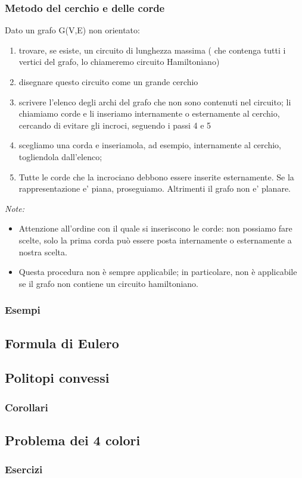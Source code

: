 \subsubsection{Metodo del cerchio e delle corde}
Dato un grafo G(V,E) non orientato:
\begin{enumerate}
\item trovare, se esiste, un circuito di lunghezza massima ( che
contenga tutti i vertici del grafo, lo chiameremo circuito
Hamiltoniano)
\item disegnare questo circuito come un grande cerchio
\item scrivere l'elenco degli archi del grafo che non sono
contenuti nel circuito; li chiamiamo corde e li inseriamo
internamente o esternamente al cerchio, cercando di
evitare gli incroci, seguendo i passi 4 e 5
\item scegliamo una corda e inseriamola, ad esempio,
internamente al cerchio, togliendola dall'elenco;
\item Tutte le corde che la incrociano debbono essere inserite
esternamente. Se la rappresentazione e' piana,
proseguiamo. Altrimenti il grafo non e' planare.
\end{enumerate}
\emph{Note:}
\begin{itemize}
\item Attenzione all'ordine con il quale si inseriscono le corde:
non possiamo fare scelte, solo la prima corda può essere
posta internamente o esternamente a nostra scelta.
\item Questa procedura non è sempre applicabile; in
particolare, non è applicabile se il grafo non contiene un
circuito hamiltoniano.
\end{itemize}

\subsubsection{Esempi}

\subsection{Formula di Eulero}

\subsection{Politopi convessi}

\subsubsection{Corollari}

\subsection{Problema dei 4 colori}

\subsubsection{Esercizi}

\newpage

